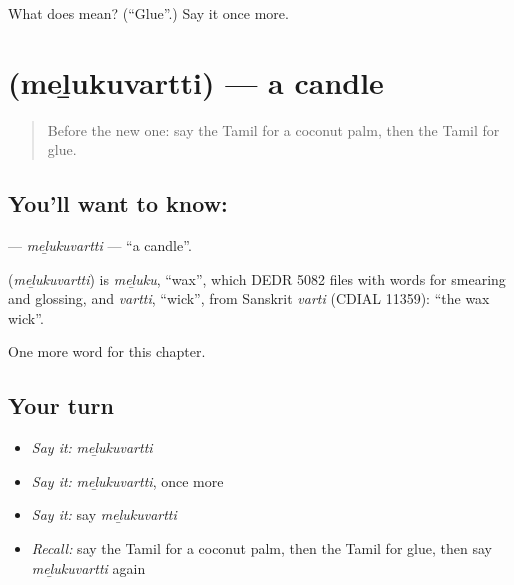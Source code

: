 \begin{tcolorbox}[breakable,colback=teal!4,colframe=teal!35!black,title={Before you move on}]
What does  mean? (\textquotedblleft{}Glue\textquotedblright{}.) Say it once more.
\end{tcolorbox}
\section[\texorpdfstring{\ta{மெழுகுவர்த்தி} (meḻukuvartti)}{மெழுகுவர்த்தி (meḻukuvartti)}]{ (meḻukuvartti) — a candle}

\label{lesson:TA-C189-melukuvartti}



\begin{quote}
Before the new one: say the Tamil for a coconut palm, then the Tamil for glue.
\end{quote}

\subsection*{You'll want to know: }
\textbf{} — \emph{meḻukuvartti} — \textquotedblleft{}a candle\textquotedblright{}.

\begin{cousinweb}
\textbf{} (\emph{meḻukuvartti}) is \emph{meḻuku}, \textquotedblleft{}wax\textquotedblright{}, which DEDR 5082 files with words for smearing and glossing, and \emph{vartti}, \textquotedblleft{}wick\textquotedblright{}, from Sanskrit \emph{varti} (CDIAL 11359): \textquotedblleft{}the wax wick\textquotedblright{}.
\end{cousinweb}

\begin{grammarlens}[title={What you've built}]
One more word for this chapter.
\end{grammarlens}

\subsection*{Your turn}
\begin{itemize}
\raggedright
  \item \emph{Say it:} \emph{meḻukuvartti}
  \item \emph{Say it:} \emph{meḻukuvartti}, once more
  \item \emph{Say it:} say \emph{meḻukuvartti}
  \item \emph{Recall:} say the Tamil for a coconut palm, then the Tamil for glue, then say \emph{meḻukuvartti} again
\end{itemize}

